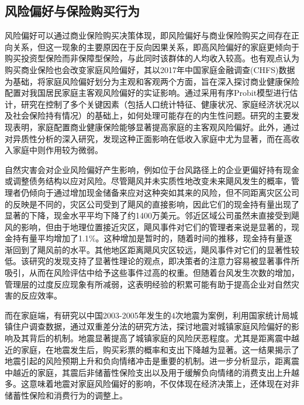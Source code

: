 \subsection{风险偏好与保险购买行为}
风险偏好可以通过商业保险购买决策体现，即风险偏好与商业保险购买之间存在正向关系\citep{宋章良2021我国中老年家庭风险偏好对商业保险购买行为的影响研究}，但这一现象的主要原因在于反向因果关系，即高风险偏好的家庭更倾向于购买投资型保险而非保障型保险，与此同时该群体的人均收入较高。也有观点认为购买商业保险也会改变家庭风险偏好\citep{孙武军2023商业健康保险的配置能够改变家庭的风险偏好吗}，其以2017年中国家庭金融调查(CHFS)数据为基础，将家庭风险偏好划分为主观和客观两个方面，旨在深入探讨商业健康保险配置对我国居民家庭主客观风险偏好的实证影响。通过采用有序Probit模型进行估计，研究在控制了多个关键因素（包括人口统计特征、健康状况、家庭经济状况以及社会保险持有情况）的基础上，如何处理可能存在的内生性问题。研究的主要发现表明，家庭配置商业健康保险能够显著提高家庭的主客观风险偏好。此外，通过对异质性分析的深入研究，发现这种正面影响在低收入家庭中尤为显著，而在高收入家庭中则作用较为微弱。

自然灾害会对企业风险偏好产生影响，例如位于台风路径上的企业更偏好持有现金\citep{杨娜娜2019自然灾害与企业现金持有}或调整债务结构\citep{shao2024typhoons}以应对风险。尽管飓风并未实质性地改变未来飓风发生的概率，管理者仍倾向于通过增加现金储备来应对这种突如其来的风险\citep{0Do}，但不同距离灾区公司的反映是不同的，灾区公司受到了飓风的直接影响，因此它们的现金持有量出现了显著的下降，现金水平平均下降了约1400万美元。邻近区域公司虽然未直接受到飓风的影响，但由于地理位置接近灾区，飓风事件对它们的管理者来说是显著的，现金持有量平均增加了1.1\%。这种增加是暂时的，随着时间的推移，现金持有量逐渐回到了飓风前的水平。其他地区距离飓风灾区较远，飓风事件对它们的显著性较低。该研究的发现支持了显著性理论的观点，即决策者的注意力容易被显著事件所吸引，从而在风险评估中给予这些事件过高的权重。但随着台风发生次数的增加，管理层的过度反应现象有所减弱，这表明经验的积累可能有助于提高企业对自然灾害的反应效率。

而在家庭端，有研究以中国2003-2005年发生的4次地震为案例，利用国家统计局城镇住户调查数据，通过双重差分法的研究方法，探讨地震对城镇家庭风险偏好的影响及其背后的机制\citep{章元0地震冲击对风险偏好的影响}。地震显著提高了城镇家庭的风险厌恶程度。尤其是距离震中越近的家庭，在地震发生后，购买彩票的概率和支出下降越为显著。这一结果揭示了地震引起的风险预期上升和负向情绪冲击是重要的机制。进一步分析显示，距离震中越近的家庭，其震后非储蓄性保险支出以及用于缓解负向情绪的消费支出上升越多。这意味着地震对家庭风险偏好的影响，不仅体现在经济决策上，还体现在对非储蓄性保险和消费行为的调整上。

